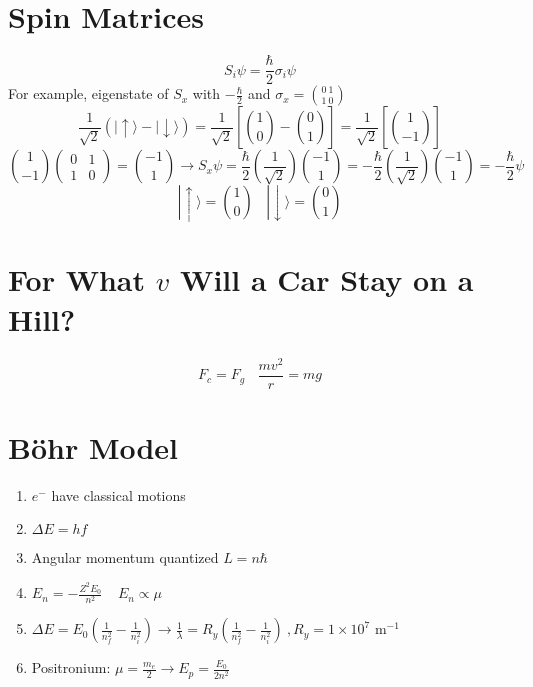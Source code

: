 \documentclass[10pt,letter]{article}
\begin{document}
\section{Spin Matrices} %
\label{sec:spin_matrices}
\begin{equation}
    S_i \psi = \frac{\hbar}{2}\sigma_i \psi
\end{equation}
For example, eigenstate of $S_x$ with $-\frac{\hbar}{2}$ and $\sigma_x = \binom{0~1}{1~0}$
\begin{equation}
    \frac{1}{\sqrt{2}} ( | \uparrow \rangle -  | \downarrow \rangle) = \frac{1}{\sqrt{2}}  \left[ \binom{1}{0} - \binom{0}{1} \right] = \frac{1}{\sqrt{2}} \left[ \binom{1}{-1} \right]
\end{equation}
\begin{equation}
    \binom{1}{-1} \begin{pmatrix} 
  0 & 1\\ 
  1 & 0
\end{pmatrix} = \binom{-1}{1} \rightarrow S_x\psi = \frac{\hbar}{2} \left( \frac{1}{\sqrt{2}} \right)  \binom{-1}{1} = -\frac{\hbar}{2} \left( \frac{1}{\sqrt{2}} \right) \binom{-1}{1} = -\frac{\hbar}{2}\psi
\end{equation}
\begin{equation}
    |\uparrow \rangle = \binom{1}{0}~~~~|\downarrow \rangle = \binom{0}{1}
\end{equation}

\section{For What $v$ Will a Car Stay on a Hill?} %
\label{sec:for_what_}
\begin{equation}
    F_c = F_g ~~~~ \frac{mv^2}{r}=mg
\end{equation}

\section{B\"ohr Model} %
\label{sec:bohr_model}
\begin{enumerate}
    \item $e^-$ have classical motions
    \item $\Delta E = hf$
    \item Angular momentum quantized   $L=n\hbar$
    \item $E_n = -\frac{Z^2E_0}{n^2}~~~~~ E_n \propto \mu$
    \item $\Delta E = E_0 \left( \frac{1}{n_f^2}  -\frac{1}{n_i^2} \right) \rightarrow \frac{1}{\lambda} = R_y \left( \frac{1}{n_f^2} - \frac{1}{n_i^2} \right) ~, R_y=1\times10^7$ m$^{-1}$
    \item Positronium: $\mu = \frac{m_e}{2} \rightarrow E_p = \frac{E_0}{2n^2}$
\end{enumerate}
\end{document}
